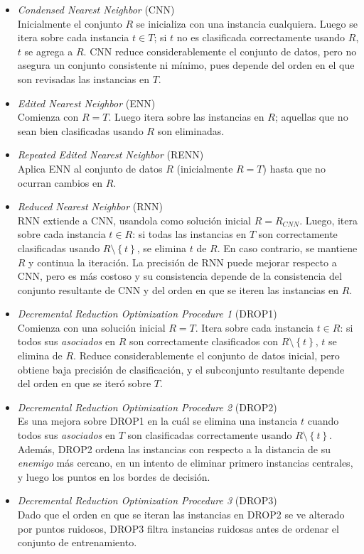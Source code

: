 \begin{itemize}
\item \emph{Condensed Nearest Neighbor} (CNN) \cite{Hart:2006:CNN:2263267.2267647}\\
Inicialmente el conjunto $R$ se inicializa con una instancia cualquiera. Luego se itera sobre cada instancia $t \in T$; si $t$ no es clasificada correctamente usando $R$, $t$ se agrega a $R$.
CNN reduce considerablemente el conjunto de datos, pero no asegura un conjunto consistente ni mínimo, pues depende del orden en el que son revisadas las instancias en $T$.
\item \emph{Edited Nearest Neighbor} (ENN) \cite{wilson1972asymptotic}\\
Comienza con $R = T$. Luego itera sobre las instancias en $R$; aquellas que no sean bien clasificadas usando $R$ son eliminadas.
\item \emph{Repeated Edited Nearest Neighbor} (RENN) \cite{wilson1972asymptotic}\\
Aplica ENN al conjunto de datos $R$ (inicialmente $R = T$) hasta que no ocurran cambios en $R$.
\item \emph{Reduced Nearest Neighbor} (RNN) \cite{DBLP:journals/tit/Gates72}\\
RNN extiende a CNN, usandola como solución inicial $R = R_{CNN}$. Luego, itera sobre cada instancia $t \in R$: si todas las instancias en $T$ son correctamente clasificadas usando $R\setminus\left\lbrace t \right\rbrace$, se elimina $t$ de $R$. En caso contrario, se mantiene $R$ y continua la iteración. La precisión de RNN puede mejorar respecto a CNN, pero es más costoso y su consistencia depende de la consistencia del conjunto resultante de CNN y del orden en que se iteren las instancias en $R$.
\item \emph{Decremental Reduction Optimization Procedure 1} (DROP1) \cite{Wilson:1997:IPT:645526.657143}\\
Comienza con una solución inicial $R = T$. Itera sobre cada instancia $t \in R$: si todos sus \emph{asociados} en $R$ son correctamente clasificados con $R\setminus\left\lbrace t \right\rbrace$, $t$ se elimina de $R$. Reduce considerablemente el conjunto de datos inicial, pero obtiene baja precisión de clasificación, y el subconjunto resultante depende del orden en que se iteró sobre $T$.
\item \emph{Decremental Reduction Optimization Procedure 2} (DROP2) \cite{Wilson:1997:IPT:645526.657143}\\
Es una mejora sobre DROP1 en la cuál se elimina una instancia $t$ cuando todos sus \emph{asociados} en $T$ son clasificadas correctamente usando $R\setminus\left\lbrace t \right\rbrace$. Además, DROP2 ordena las instancias con respecto a la distancia de su \emph{enemigo} más cercano, en un intento de eliminar primero instancias centrales, y luego los puntos en los bordes de decisión.
\item \emph{Decremental Reduction Optimization Procedure 3} (DROP3) \cite{Wilson:1997:IPT:645526.657143}\\
Dado que el orden en que se iteran las instancias en DROP2 se ve alterado por puntos ruidosos, DROP3 filtra instancias ruidosas antes de ordenar el conjunto de entrenamiento.
\end{itemize}

